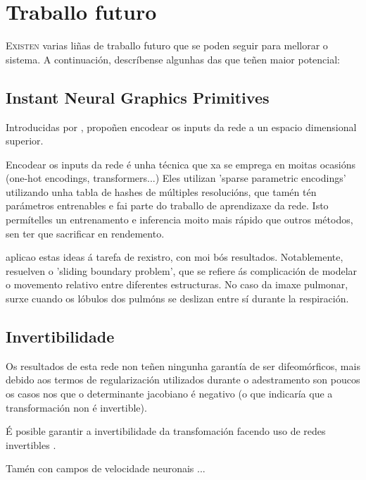 \chapter{Traballo futuro}
\label{chap:Traballo futuro}

\lettrine{E}{xisten} varias liñas de traballo futuro que se poden seguir para mellorar o sistema.
A continuación, descríbense algunhas das que teñen maior potencial:

\section{Instant Neural Graphics Primitives}
\label{sec:Instant Neural Graphics Primitives}

Introducidas por \cite{mueller2022instant}, propoñen encodear os inputs da rede a un espacio dimensional superior.

Encodear os inputs da rede é unha técnica que xa se emprega en moitas ocasións (one-hot encodings, transformers...)
Eles utilizan 'sparse parametric encodings' utilizando unha tabla de hashes de múltiples resolucións, que tamén tén parámetros entrenables e fai parte do traballo de aprendizaxe da rede.
Isto permítelles un entrenamento e inferencia moito mais rápido que outros métodos, sen ter que sacrificar en rendemento.

\cite{li2024neuralgraphicsprimitivesdeformable} aplicao estas ideas á tarefa de rexistro, con moi bós resultados.
Notablemente, resuelven o 'sliding boundary problem', que se refiere ás complicación de modelar o movemento relativo entre diferentes estructuras. No caso da imaxe pulmonar, surxe cuando os lóbulos dos pulmóns se deslizan entre sí durante la respiración.



\section{Invertibilidade}
\label{sec:Invertibilidade}

Os resultados de esta rede non teñen ningunha garantía de ser difeomórficos, 
mais debido aos termos de regularización utilizados durante o adestramento son poucos os casos nos que o determinante jacobiano é negativo (o que indicaría que a transformación non é invertible).

É posible garantir a invertibilidade da transfomación facendo uso de redes invertibles \cite{jacobsen2018irevnetdeepinvertiblenetworks}.

Tamén con campos de velocidade neuronais \cite{sun2024medicalimageregistrationneural} ...